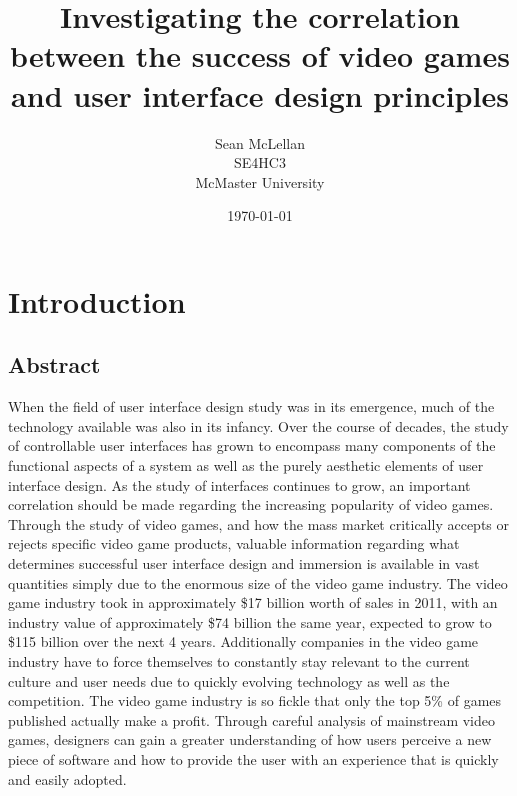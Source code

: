 \documentclass[12pt]{report}
\title{Investigating the correlation between the success of video games and user interface design principles}
\author{Sean McLellan\\ SE4HC3\\ McMaster University}
\date{\today}
\begin{document}
\maketitle

\chapter{Introduction}
\section{Abstract}
When the field of user interface design study was in its emergence, much of the technology available was also in its infancy. Over the course of decades, the study of controllable user interfaces has grown to encompass many components of the functional aspects of a system as well as the purely aesthetic elements of user interface design. As the study of interfaces continues to grow, an important correlation should be made regarding the increasing popularity of video games. Through the study of video games, and how the mass market critically accepts or rejects specific video game products, valuable information regarding what determines successful user interface design and immersion is available in vast quantities simply due to the enormous size of the video game industry. The video game industry took in approximately \$17 billion worth of sales in 2011\cite{GeorgSzalai}, with an industry value of approximately \$74 billion the same year, expected to grow to \$115 billion over the next 4 years\cite{DavidHinkle}. Additionally companies in the video game industry have to force themselves to constantly stay relevant to the current culture and user needs due to quickly evolving technology as well as the competition. The video game industry is so fickle that only the top 5\% of games published actually make a profit\cite{PaulGillin}. Through careful analysis of mainstream video games, designers can gain a greater understanding of how users perceive a new piece of software and how to provide the user with an experience that is quickly and easily adopted.
\end{document}
